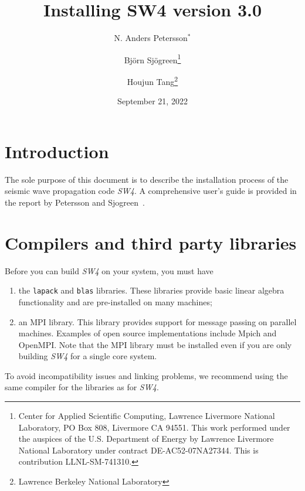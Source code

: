 \documentclass[11pt]{article}
\begin{document}
\title{Installing SW4 version 3.0}

\author{ N. Anders Petersson$^*$ \and Bj\"orn Sj\"ogreen\thanks{Center for Applied Scientific
    Computing, Lawrence Livermore National Laboratory, PO Box 808, Livermore CA 94551. This work
    performed under the auspices of the U.S. Department of Energy by Lawrence Livermore National
    Laboratory under contract DE-AC52-07NA27344. This is contribution
    LLNL-SM-741310.} 
\and Houjun Tang\thanks{ Lawrence Berkeley National Laboratory}
    }
\date{September 21, 2022}
\maketitle




\tableofcontents

\section{Introduction}
The sole purpose of this document is to describe the installation process of the seismic wave
propagation code \emph{SW4}. A comprehensive user's guide is provided in the report by
Petersson and Sjogreen~\cite{SW4-v3}.

\section{Compilers and third party libraries}

Before you can build \emph{SW4} on your system, you must have
\begin{enumerate}
\item the \verb+lapack+ and \verb+blas+ libraries. These libraries provide basic linear algebra functionality and are pre-installed on many machines;
\item an MPI library. This library provides support for message passing on parallel
  machines. Examples of open source implementations include Mpich and OpenMPI. Note that the MPI library must be installed even if you are only building \emph{SW4} for a single core system.
\end{enumerate}

To avoid incompatibility issues and linking problems, we recommend using the same compiler for the libraries as for \emph{SW4}.
\end{document}
